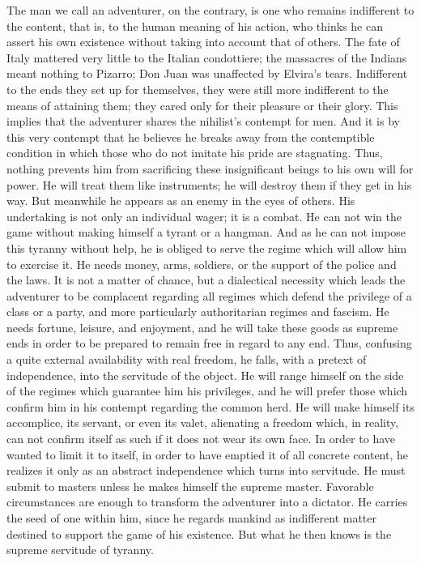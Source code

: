 \documentclass[11pt]{article}
\begin{document}
The man we call an adventurer, on the contrary, is one who remains indifferent to the content, that is, to the human meaning of his action, who thinks he can assert his own existence without taking into account that of others. The fate of Italy mattered very little to the Italian condottiere; the massacres of the Indians meant nothing to Pizarro; Don Juan was unaffected by Elvira’s tears. Indifferent to the ends they set up for themselves, they were still more indifferent to the means of attaining them; they cared only for their pleasure or their glory. This implies that the adventurer shares the nihilist’s contempt for men. And it is by this very contempt that he believes he breaks away from the contemptible condition in which those who do not imitate his pride are stagnating. Thus, nothing prevents him from sacrificing these insignificant beings to his own will for power. He will treat them like instruments; he will destroy them if they get in his way. But meanwhile he appears as an enemy in the eyes of others. His undertaking is not only an individual wager; it is a combat. He can not win the game without making himself a tyrant or a hangman. And as he can not impose this tyranny without help, he is obliged to serve the regime which will allow him to exercise it. He needs money, arms, soldiers, or the support of the police and the laws. It is not a matter of chance, but a dialectical necessity which leads the adventurer to be complacent regarding all regimes which defend the privilege of a class or a party, and more particularly authoritarian regimes and fascism. He needs fortune, leisure, and enjoyment, and he will take these goods as supreme ends in order to be prepared to remain free in regard to any end. Thus, confusing a quite external availability with real freedom, he falls, with a pretext of independence, into the servitude of the object. He will range himself on the side of the regimes which guarantee him his privileges, and he will prefer those which confirm him in his contempt regarding the common herd. He will make himself its accomplice, its servant, or even its valet, alienating a freedom which, in reality, can not confirm itself as such if it does not wear its own face. In order to have wanted to limit it to itself, in order to have emptied it of all concrete content, he realizes it only as an abstract independence which turns into servitude. He must submit to masters unless he makes himself the supreme master. Favorable circumstances are enough to transform the adventurer into a dictator. He carries the seed of one within him, since he regards mankind as indifferent matter destined to support the game of his existence. But what he then knows is the supreme servitude of tyranny.
\end{document}
